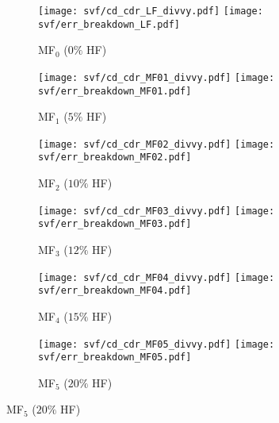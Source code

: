 \begin{figure}[h!]
\begin{subfigure}[b]{\textwidth}
\centering
	\texttt{[image: svf/cd\_cdr\_LF\_divvy.pdf]}
  \texttt{[image: svf/err\_breakdown\_LF.pdf]}
  \vspace{-0.7\baselineskip}
  \caption{MF$_0$ ($0\%$ HF)}
  \vspace{0.8\baselineskip}
\end{subfigure}
\begin{subfigure}[b]{\textwidth}
	\centering
	\texttt{[image: svf/cd\_cdr\_MF01\_divvy.pdf]}
  \texttt{[image: svf/err\_breakdown\_MF01.pdf]}
  \vspace{-0.7\baselineskip}
  \caption{MF$_1$ ($5\%$ HF)}
  \vspace{0.8\baselineskip}
\end{subfigure}
\begin{subfigure}[b]{\textwidth}
  \centering
  \texttt{[image: svf/cd\_cdr\_MF02\_divvy.pdf]}
  \texttt{[image: svf/err\_breakdown\_MF02.pdf]}
  \vspace{-0.7\baselineskip}
  \caption{MF$_2$ ($10\%$ HF)}
  \vspace{0.8\baselineskip}
\end{subfigure}
\begin{subfigure}[b]{\textwidth}
	\centering
	\texttt{[image: svf/cd\_cdr\_MF03\_divvy.pdf]}
  \texttt{[image: svf/err\_breakdown\_MF03.pdf]}
  \vspace{-0.7\baselineskip}
  \caption{MF$_3$ ($12\%$ HF)}
  \vspace{0.8\baselineskip}
\end{subfigure}
\begin{subfigure}[b]{\textwidth}
	\centering
	\texttt{[image: svf/cd\_cdr\_MF04\_divvy.pdf]}
  \texttt{[image: svf/err\_breakdown\_MF04.pdf]}
  \vspace{-0.7\baselineskip}
  \caption{MF$_4$ ($15\%$ HF)}
  \vspace{0.8\baselineskip}
\end{subfigure}
\begin{subfigure}[b]{\textwidth}
	\centering
	\texttt{[image: svf/cd\_cdr\_MF05\_divvy.pdf]}
  \texttt{[image: svf/err\_breakdown\_MF05.pdf]}
  \vspace{-0.7\baselineskip}
  \caption{MF$_5$ ($20\%$ HF)}

\end{subfigure}
\end{figure}
